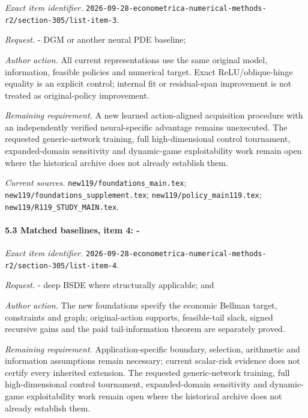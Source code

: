 \emph{Exact item identifier.} \nolinkurl{2026-09-28-econometrica-numerical-methods-r2/section-305/list-item-3}.

\par\emph{Request.} - DGM or another neural PDE baseline;

\par\emph{Author action.} All current representations use the same original model, information, feasible policies and numerical target. Exact ReLU/\allowbreak{}oblique-hinge equality is an explicit control; internal fit or residual-span improvement is not treated as original-policy improvement.

\par\emph{Remaining requirement.} A new learned action-aligned acquisition procedure with an independently verified neural-specific advantage remains unexecuted. The requested generic-network training, full high-dimensional control tournament, expanded-domain sensitivity and dynamic-game exploitability work remain open where the historical archive does not already establish them.

\par\emph{Current sources.} \nolinkurl{new119/foundations_main.tex}; \nolinkurl{new119/foundations_supplement.tex}; \nolinkurl{new119/policy_main119.tex}; \nolinkurl{new119/R119_STUDY_MAIN.tex}.

\paragraph{5.3 Matched baselines, item 4: -}

\emph{Exact item identifier.} \nolinkurl{2026-09-28-econometrica-numerical-methods-r2/section-305/list-item-4}.

\par\emph{Request.} - deep BSDE where structurally applicable; and

\par\emph{Author action.} The new foundations specify the economic Bellman target, constraints and graph; original-action supports, feasible-tail slack, signed recursive gains and the paid tail-information theorem are separately proved.

\par\emph{Remaining requirement.} Application-specific boundary, selection, arithmetic and information assumptions remain necessary; current scalar-risk evidence does not certify every inherited extension. The requested generic-network training, full high-dimensional control tournament, expanded-domain sensitivity and dynamic-game exploitability work remain open where the historical archive does not already establish them.


